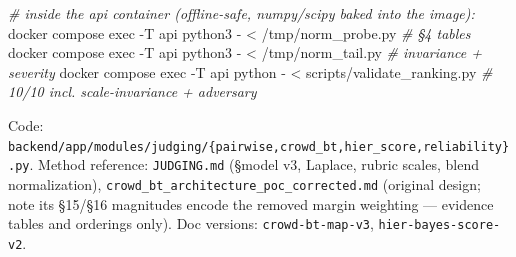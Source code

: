 \documentclass[
  11pt,
]{article}
\newenvironment{Shaded}{}{}
\newcommand{\AttributeTok}[1]{\textcolor[rgb]{0.49,0.56,0.16}{#1}}
\newcommand{\CommentTok}[1]{\textcolor[rgb]{0.38,0.63,0.69}{\textit{#1}}}
\newcommand{\ExtensionTok}[1]{#1}
\newcommand{\NormalTok}[1]{#1}
\newcommand{\OperatorTok}[1]{\textcolor[rgb]{0.40,0.40,0.40}{#1}}
\begin{document}
\begin{Shaded}
\begin{Highlighting}[]
\CommentTok{\# inside the api container (offline{-}safe, numpy/scipy baked into the image):}
\ExtensionTok{docker}\NormalTok{ compose exec }\AttributeTok{{-}T}\NormalTok{ api python3 }\AttributeTok{{-}} \OperatorTok{\textless{}}\NormalTok{ /tmp/norm\_probe.py   }\CommentTok{\# §4 tables}
\ExtensionTok{docker}\NormalTok{ compose exec }\AttributeTok{{-}T}\NormalTok{ api python3 }\AttributeTok{{-}} \OperatorTok{\textless{}}\NormalTok{ /tmp/norm\_tail.py    }\CommentTok{\# invariance + severity}
\ExtensionTok{docker}\NormalTok{ compose exec }\AttributeTok{{-}T}\NormalTok{ api python }\AttributeTok{{-}} \OperatorTok{\textless{}}\NormalTok{ scripts/validate\_ranking.py  }\CommentTok{\# 10/10 incl. scale{-}invariance + adversary}
\end{Highlighting}
\end{Shaded}

Code:
\texttt{backend/app/modules/judging/\{pairwise,crowd\_bt,hier\_score,reliability\}.py}.
Method reference: \texttt{JUDGING.md} (§model v3, Laplace, rubric
scales, blend normalization),
\texttt{crowd\_bt\_architecture\_poc\_corrected.md} (original design;
note its §15/§16 magnitudes encode the removed margin weighting ---
evidence tables and orderings only). Doc versions:
\texttt{crowd-bt-map-v3}, \texttt{hier-bayes-score-v2}.
\end{document}

